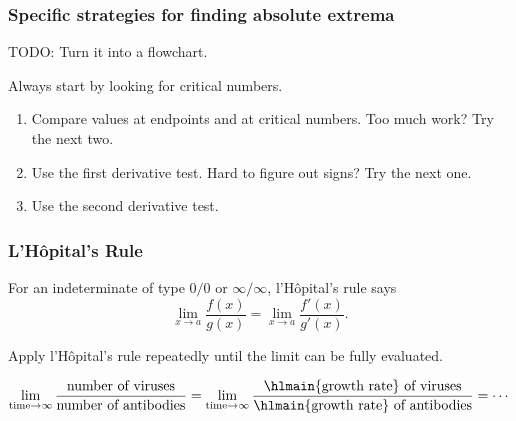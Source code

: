 \documentclass[aspectratio=169, 12pt]{beamer}
\begin{document}
\begin{frame}
  \frametitle{Specific strategies for finding absolute extrema}

  TODO: Turn it into a flowchart.

  Always start by looking for critical numbers.
  \begin{enumerate}
    \item Compare values at endpoints and at critical numbers.  Too much work? Try the next two.
    \item Use the first derivative test.  Hard to figure out signs? Try the next one.
    \item Use the second derivative test.
  \end{enumerate}
\end{frame}


\begin{frame}
  \frametitle{L'H\^opital's Rule}

  For an indeterminate of type \(0/0\) or \(\infty/\infty\), l'H\^opital's rule says
  \[
    \lim_{x \to a} \frac{f(x)}{g(x)} = \lim_{x \to a} \frac{f'(x)}{g'(x)}.
  \]

  Apply l'H\^opital's rule repeatedly until the limit can be fully evaluated.

  \[
    \lim_{\text{time} \to \infty} \frac{\text{number of viruses}}{\text{number of antibodies}} = \lim_{\text{time} \to \infty} \frac{\text{\hlmain{growth rate} of viruses}}{\text{\hlmain{growth rate} of antibodies}} = \cdots
  \]
\end{frame}
\end{document}

